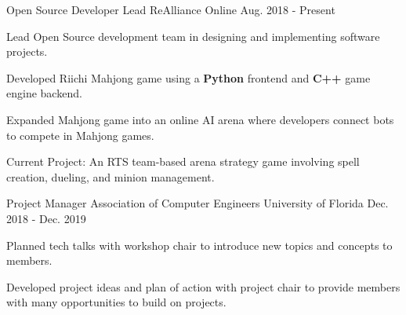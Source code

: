 


\begin{cventries}


\cventry
{Open Source Developer Lead} %
{ReAlliance} %
{Online} %
{Aug. 2018 - Present} %
{ %
	\begin{cvitems}
		\setlength{\itemindent}{.125in}
		\item {Lead Open Source development team in designing and implementing software projects.}
		\item {Developed Riichi Mahjong game using a \textbf{Python} frontend and \textbf{C++} game engine backend.}
		\item {Expanded Mahjong game into an online AI arena where developers connect bots to compete in Mahjong games.}
		\item {Current Project: An RTS team-based arena strategy game involving spell creation, dueling, and minion management.}
	\end{cvitems}
}


\cventry
{Project Manager} %
{Association of Computer Engineers} %
{University of Florida} %
{Dec. 2018 - Dec. 2019} %
{ %
	\begin{cvitems}
		\setlength{\itemindent}{.125in}
		\item {Planned tech talks with workshop chair to introduce new topics and concepts to members.}
		\item {Developed project ideas and plan of action with project chair to provide members with many opportunities to build on projects.}
	\end{cvitems}
}


\end{cventries}
